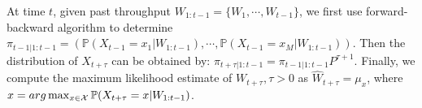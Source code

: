 At time $t$, given past throughput $W_{1:t-1}=\{W_1,\cdots,W_{t-1} \}$, we first use
forward-backward algorithm \cite{bishop2006pattern} to determine
$\pi_{t-1|1:t-1} = (\mathbb{P}(X_{t-1} = x_1|W_{1:t-1}), \cdots,
\mathbb{P}(X_{t-1} = x_M|W_{1:t-1}))$. Then the distribution of $X_{t+\tau}$ can be
obtained by: $\pi_{t+\tau|1:t-1} = \pi_{t-1|1:t-1}P^{\tau+1}$. Finally, we compute
 the maximum likelihood estimate of $W_{t+\tau}, \tau > 0$  as
$\hat{W}_{t+\tau} = \mu_x$, where $x = arg\max_{x\in{\cal X}}
\mathbb{P}(X_{t+\tau}=x|W_{1:t-1})$.




